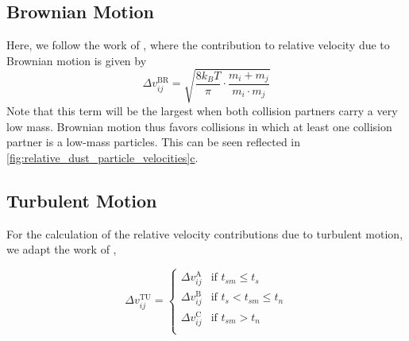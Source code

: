     \subsection{Brownian Motion}

        Here, we follow the work of \cite{dullemond_dominik_2004}, where the contribution to 
        relative velocity due to Brownian motion is given by
        \begin{equation}
            \Delta v_{ij}^\text{BR}
            =\sqrt{\frac{8k_BT}{\pi}\cdot\frac{m_i+m_j}{m_i\cdot m_j}}
        \end{equation}
        Note that this term will be the largest when both collision partners carry a very low mass.
        Brownian motion thus favors collisions in which at least one collision partner is a 
        low-mass particles. This can be seen reflected in 
        \hyperref[fig:relative_dust_particle_velocities]{
        \cref*{fig:relative_dust_particle_velocities}c}.

    \clearpage\subsection{Turbulent Motion}

        For the calculation of the relative velocity contributions due to turbulent motion, we 
        adapt the work of \cite{ormel_cuzzi_2007}, 

        \begin{equation}
            \Delta v^\text{TU}_{ij} =
            \begin{cases}
                \Delta v_{ij}^\text{A} & \text{if } t_{sm} \leq t_s \\
                \Delta v_{ij}^\text{B} & \text{if } t_s < t_{sm} \leq t_n \\
                \Delta v_{ij}^\text{C} & \text{if } t_{sm} > t_n \\
            \end{cases}
        \end{equation}


